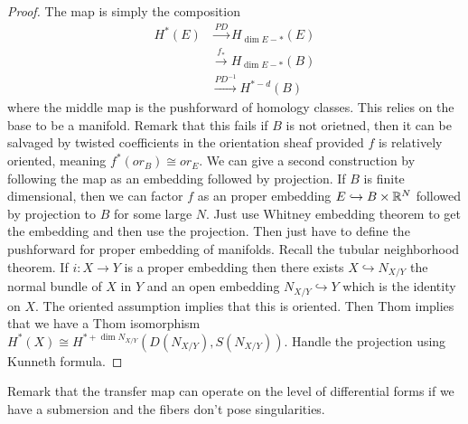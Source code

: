 \documentclass[12pt]{article}
\begin{document}
\begin{proof}
    The map is simply the composition \begin{align*}
        H^*(E) &\xrightarrow{PD} H_{\dim E - *}(E) \\
        &\xrightarrow{f_*} H_{\dim E - *}(B) \\
        &\xrightarrow{PD^{-1}} H^{*-d}(B)
    \end{align*}
    where the middle map is the pushforward of homology classes. This relies on the base to be a manifold. Remark that this fails if $B$ is not orietned, then it can be salvaged by twisted coefficients in the orientation sheaf provided $f$ is relatively oriented, meaning $f^*(or_B) \cong or_E$. We can give a second construction by following the map as an embedding followed by projection. If $B$ is finite dimensional, then we can factor $f$ as an proper embedding $E \hookrightarrow B \times \mathbb{R}^N$ followed by projection to $B$ for some large $N$. Just use Whitney embedding theorem to get the embedding and then use the projection. Then just have to define the pushforward for proper embedding of manifolds. Recall the tubular neighborhood theorem. If $i:X\to Y$ is a proper embedding then there exists $X \hookrightarrow N_{X/Y}$ the normal bundle of $X$ in $Y$ and an open embedding $N_{X/Y} \hookrightarrow Y$ which is the identity on $X$. The oriented assumption implies that this is oriented. Then Thom implies that we have a Thom isomorphism $H^*(X) \cong H^{* + \dim N_{X/Y}}(D(N_{X/Y}), S(N_{X/Y}))$. Handle the projection using Kunneth formula.
\end{proof}
Remark that the transfer map can operate on the level of differential forms if we have a submersion and the fibers don't pose singularities. 
\end{document}
